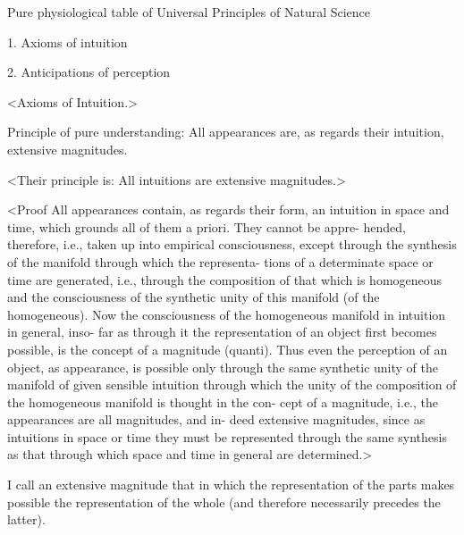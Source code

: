 Pure physiological table
of Universal Principles of Natural Science

1.
Axioms
of intuition

2.
Anticipations
of perception

<Axioms of Intuition.>

Principle of pure understanding: All appearances are, as
regards their intuition, extensive magnitudes.

<Their principle is: All intuitions are
extensive magnitudes.>

<Proof
All appearances contain, as regards their form, an intuition in space
and time, which grounds all of them a priori. They cannot be appre-
hended, therefore, i.e., taken up into empirical consciousness, except
through the synthesis of the manifold through which the representa-
tions of a determinate space or time are generated, i.e., through the
composition of that which is homogeneous and the consciousness of
the synthetic unity of this manifold (of the homogeneous). Now the
consciousness of the homogeneous manifold in intuition in general, inso-
far as through it the representation of an object first becomes possible,
is the concept of a magnitude (quanti). Thus even the perception of an
object, as appearance, is possible only through the same synthetic unity
of the manifold of given sensible intuition through which the unity of
the composition of the homogeneous manifold is thought in the con-
cept of a magnitude, i.e., the appearances are all magnitudes, and in-
deed extensive magnitudes, since as intuitions in space or time they
must be represented through the same synthesis as that through which
space and time in general are determined.>

I call an extensive magnitude that in which the representation of the
parts makes possible the representation of the whole (and therefore
necessarily precedes the latter).


